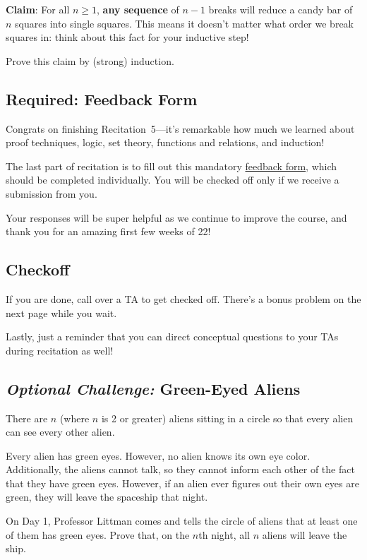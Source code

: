 \documentclass[12pt,letterpaper]{article}
\begin{document}
\textbf{Claim}: For all $n \geq 1$, \textbf{any sequence} of $n-1$ breaks will reduce a candy bar of $n$ squares into single squares. This means it doesn't matter what order we break squares in: think about this fact for your inductive step!

Prove this claim by (strong) induction. 

\begin{mdframed} \vspace{8cm} \end{mdframed}


\subsection*{Required: Feedback Form}
Congrats on finishing Recitation~5---it's remarkable how much we learned about proof techniques, logic, set theory, functions and relations, and induction!

The last part of recitation is to fill out this mandatory \href{https://forms.gle/i9Zkq99XyaoweysF8}{\color{blue} feedback form}, which should be completed individually. You will be checked off only if we receive a submission from you.

Your responses will be super helpful as we continue to improve the course, and thank you for an amazing first few weeks of 22!

\subsection*{Checkoff}
If you are done, call over a TA to get checked off. There's a bonus problem on the next page while you wait.

Lastly, just a reminder that you can direct conceptual questions to your TAs during recitation as well!
\newpage

\subsection*{\textit{Optional Challenge:} Green-Eyed Aliens}

There are $n$ (where $n$ is 2 or greater) aliens sitting in a circle so that every alien can see every other alien.

Every alien has green eyes. However, no alien knows its own eye color. Additionally, the aliens cannot talk, so they cannot inform each other of the fact that they have green eyes. However, if an alien ever figures out their own eyes are green, they will leave the spaceship that night.

On Day 1, Professor Littman comes and tells the circle of aliens that at least one of them has green eyes. Prove that, on the $n$th night, all $n$ aliens will leave the ship. 

\begin{mdframed} \vspace{8cm} \end{mdframed}
\end{document}
